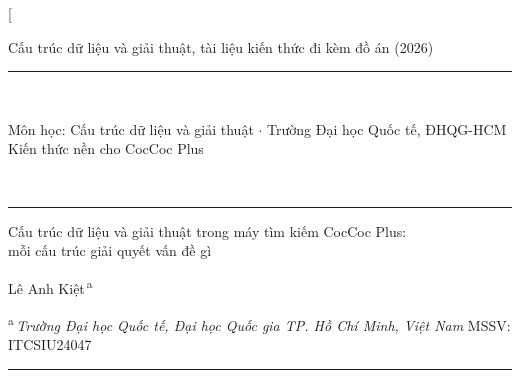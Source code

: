 \documentclass[9pt,twocolumn,a4paper]{extarticle}
\begin{document}
\thispagestyle{first}

\twocolumn[{%
\begin{@twocolumnfalse}
\vspace{-0.3cm}
\begin{center}\small\color{linkblue}Cấu trúc dữ liệu và giải thuật, tài liệu kiến thức đi kèm đồ án (2026)\end{center}
\vspace{-0.1cm}
\noindent\rule{\textwidth}{0.5pt}\\[-2pt]
\noindent\colorbox{bannergray}{\parbox{\dimexpr\textwidth-2\fboxsep}{\centering\vspace{3pt}
  {\small Môn học: Cấu trúc dữ liệu và giải thuật \;$\cdot$\; Trường Đại học Quốc tế, ĐHQG-HCM}\\[7pt]
  {\Large Kiến thức nền cho CocCoc Plus}\vspace{4pt}}}\\[-1pt]
\noindent\rule{\textwidth}{2.2pt}

\vspace{0.55cm}
{\fontsize{16.5}{20}\selectfont Cấu trúc dữ liệu và giải thuật trong máy tìm kiếm CocCoc Plus:\\mỗi cấu trúc giải quyết vấn đề gì\par}
\vspace{0.4cm}
{\large Lê Anh Kiệt\textsuperscript{\,a}\par}
\vspace{0.2cm}
{\scriptsize\textsuperscript{a}\,\textit{Trường Đại học Quốc tế, Đại học Quốc gia TP. Hồ Chí Minh, Việt Nam} \quad MSSV: ITCSIU24047\par}
\vspace{0.3cm}
\noindent\rule{\textwidth}{0.4pt}
\vspace{0.25cm}


\end{@twocolumnfalse}}
\end{document}
